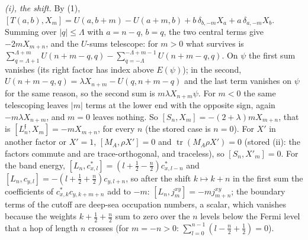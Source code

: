 \emph{(i), the shift.} By (1), $[T(a, b), X_{m}] = U(a, b + m) - U(a + m, b) + b\,\delta_{b,-m}X_{a} + a\,\delta_{a,-m}X_{b}$. Summing over $|q| \le \Lambda$ with $a = n - q$, $b = q$, the two central terms give $-2mX_{m+n}$, and the $U$-sums telescope: for $m > 0$ what survives is $\sum_{q=\Lambda+1}^{\Lambda+m}U(n + m - q, q) - \sum_{q=-\Lambda}^{-\Lambda+m-1}U(n + m - q, q)$. On $\psi$ the first sum vanishes (its right factor has index above $E(\psi)$); in the second, $U(n + m - q, q) = \lambda X_{n+m} - U(q, n + m - q)$ and the last term vanishes on $\psi$ for the same reason, so the second sum is $m\lambda X_{n+m}\psi$. For $m < 0$ the same telescoping leaves $|m|$ terms at the lower end with the opposite sign, again $-m\lambda X_{n+m}$, and $m = 0$ leaves nothing. So $[S_{n}, X_{m}] = -(2 + \lambda)mX_{m+n}$, that is $[L^{\mathfrak{f}}_{n}, X_{m}] = -mX_{m+n}$, for every $n$ (the stored case is $n = 0$). For $X'$ in another factor or $X' = 1$, $[M_{A}, \rho X'] = 0$ and $\operatorname{tr}(M_{A}\rho X') = 0$ (stored (ii): the factors commute and are trace-orthogonal, and traceless), so $[S_{n}, X'_{m}] = 0$. For the band energy, $[L_{n}, c^{*}_{x,l}] = (l + \tfrac12 - \tfrac{n}{2})c^{*}_{x,l-n}$ and $[L_{n}, c_{y,l}] = -(l + \tfrac12 + \tfrac{n}{2})c_{y,l+n}$, so after the shift $k \mapsto k + n$ in the first sum the coefficients of $c^{*}_{x,k}c_{y,k+m+n}$ add to $-m$: $[L_{n}, j^{xy}_{m}] = -mj^{xy}_{m+n}$; the boundary terms of the cutoff are deep-sea occupation numbers, a scalar, which vanishes because the weights $k + \tfrac12 + \tfrac{n}{2}$ sum to zero over the $n$ levels below the Fermi level that a hop of length $n$ crosses (for $m = -n > 0$: $\sum_{l=0}^{n-1}(l - \tfrac{n}{2} + \tfrac12) = 0$).

